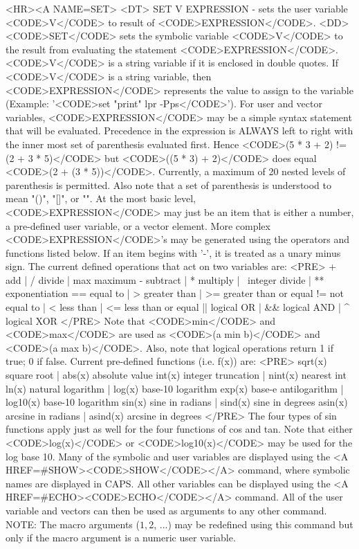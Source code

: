 \begin{rawhtml}
<HR><A NAME=SET>
<DT>
SET V EXPRESSION - sets the user variable <CODE>V</CODE> to result of <CODE>EXPRESSION</CODE>.
<DD>
	<CODE>SET</CODE> sets the symbolic variable <CODE>V</CODE> to the
	result from evaluating the statement <CODE>EXPRESSION</CODE>.
	<CODE>V</CODE> is a string variable if it is enclosed in
	double quotes.  If <CODE>V</CODE> is a string variable, then
	<CODE>EXPRESSION</CODE> represents the value to assign to the
	variable (Example: '<CODE>set "print" lpr -Pps</CODE>').  For
	user and vector variables, <CODE>EXPRESSION</CODE> may be a
	simple syntax statement that will be evaluated.  Precedence in
	the expression is ALWAYS left to right with the inner most set
	of parenthesis evaluated first.  Hence
	<CODE>(5 * 3 + 2) != (2 + 3 * 5)</CODE> but <CODE>((5 * 3) + 2)</CODE>
	does equal <CODE>(2 + (3 * 5))</CODE>.  Currently, a maximum of
	20 nested levels of parenthesis is permitted.  Also note that a
	set of parenthesis is understood to mean "()", "[]", or "{}".
	At the most basic level, <CODE>EXPRESSION</CODE> may just be an
	item that is either a number, a pre-defined user variable, or a
	vector element.  More complex <CODE>EXPRESSION</CODE>'s may be
	generated using the operators and functions listed below.  If
	an item begins with '-', it is treated as a unary minus sign.
	The current defined operations that act on two variables are:
	<PRE>
   +          add |  /         divide | max               maximum
   -     subtract |  %
   *     multiply |  \ integer divide |  **        exponentiation
  ==     equal to |  >   greater than |  >= greater than or equal
  != not equal to |  <      less than |  <=    less than or equal
  ||   logical OR | &&    logical AND |   ^           logical XOR
	</PRE>
	Note that <CODE>min</CODE> and <CODE>max</CODE> are used as
	<CODE>(a min b)</CODE> and <CODE>(a max b)</CODE>.  Also, note
	that logical operations return 1 if true; 0 if false.
	Current pre-defined functions (i.e. f(x)) are:
	<PRE>
  sqrt(x)          square root |    abs(x)        absolute value
   int(x)   integer truncation |   nint(x)           nearest int
    ln(x)    natural logarithm |    log(x)     base-10 logarithm
   exp(x) base-e antilogarithm |  log10(x)     base-10 logarithm
   sin(x)      sine in radians |   sind(x)       sine in degrees
  asin(x)   arcsine in radians |  asind(x)    arcsine in degrees
	</PRE>
        The four types of sin functions apply just as well for the
	four functions of cos and tan.
	Note that either <CODE>log(x)</CODE> or <CODE>log10(x)</CODE>
	may be used for the log base 10.  Many of the symbolic and user
	variables are displayed using the <A HREF=#SHOW><CODE>SHOW</CODE></A>
	command, where symbolic names are displayed in CAPS.  All other
	variables can be displayed using the
	<A HREF=#ECHO><CODE>ECHO</CODE></A> command.  All of the user
	variable and vectors can then be used as arguments to any other
	command.
	NOTE: The macro arguments ($1, $2, ...) may be redefined using
	this command but only if the macro argument is a numeric user variable.


\end{rawhtml}
